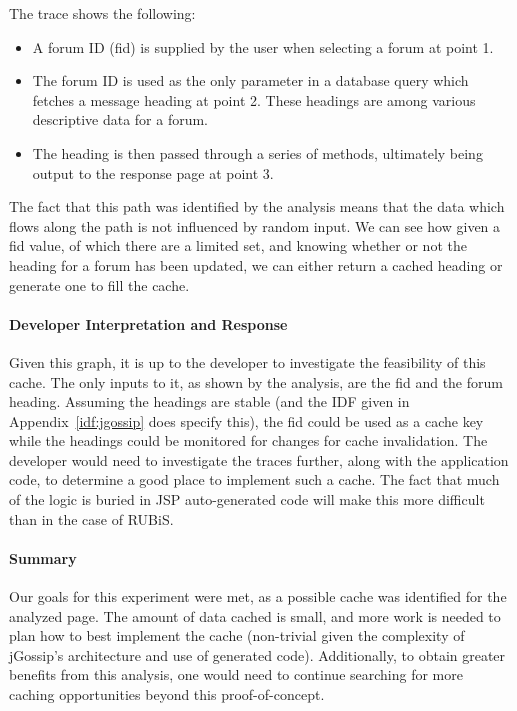 \documentclass[msc,oneside]{ubcthesis}
\begin{document}
The trace shows the following:
\begin{itemize}
\item A forum ID (fid) is supplied by the user when selecting a forum at point 1.
\item The forum ID is used as the only parameter in a database query which fetches a message heading at point 2. These headings are among various descriptive data for a forum.
\item The heading is then passed through a series of methods, ultimately being output to the response page at point 3.
\end{itemize}

The fact that this path was identified by the analysis means that the data which flows along the path is not influenced by random input. We can see how given a fid value, of which there are a limited set, and knowing whether or not the heading for a forum has been updated, we can either return a cached heading or generate one to fill the cache.

\paragraph{Developer Interpretation and Response}
Given this graph, it is up to the developer to investigate the feasibility of this cache. The only inputs to it, as shown by the analysis, are the fid and the forum heading. Assuming the headings are stable (and the IDF given in Appendix~\ref{idf:jgossip} does specify this), the fid could be used as a cache key while the headings could be monitored for changes for cache invalidation. The developer would need to investigate the traces further, along with the application code, to determine a good place to implement such a cache. The fact that much of the logic is buried in JSP auto-generated code will make this more difficult than in the case of RUBiS.

\paragraph{Summary}
Our goals for this experiment were met, as a possible cache was identified for the analyzed page. The amount of data cached is small, and more work is needed to plan how to best implement the cache (non-trivial given the complexity of jGossip's architecture and use of generated code). Additionally, to obtain greater benefits from this analysis, one would need to continue searching for more caching opportunities beyond this proof-of-concept.
\end{document}
